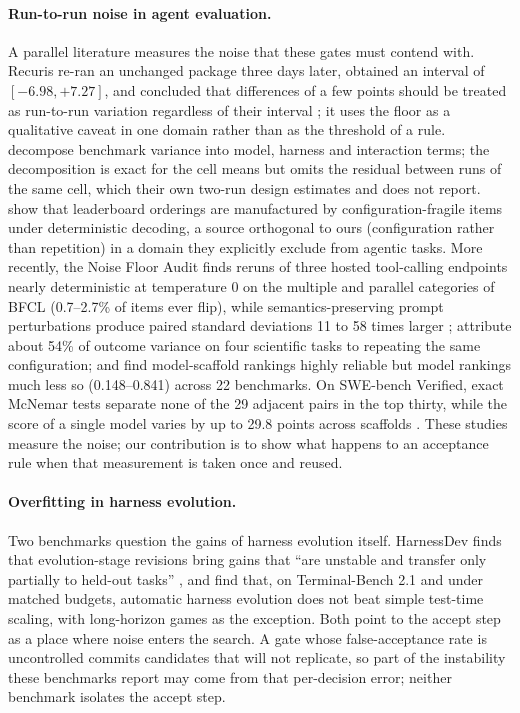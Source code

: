 \paragraph{Run-to-run noise in agent evaluation.}
A parallel literature measures the noise that these gates must contend with.
Recuris re-ran an unchanged package three days later, obtained an interval of
$[-6.98, +7.27]$, and concluded that differences of a few points should be
treated as run-to-run variation regardless of their interval
\citep{yu2026recuris}; it uses the floor as a qualitative caveat in one domain
rather than as the threshold of a rule. \citet{zhang2026stopcomparing}
decompose benchmark variance into model, harness and interaction terms; the
decomposition is exact for the cell means but omits the residual between runs
of the same cell, which their own two-run design estimates and does not report.
\citet{parupudi2026neutral} show that leaderboard orderings are manufactured
by configuration-fragile items under deterministic decoding, a source
orthogonal to ours (configuration rather than repetition) in a domain they
explicitly exclude from agentic tasks. More recently, the Noise Floor Audit finds reruns of three hosted tool-calling endpoints nearly deterministic at temperature 0 on the multiple and parallel categories of BFCL (0.7--2.7\% of items ever flip), while semantics-preserving prompt perturbations produce paired standard deviations 11 to 58 times larger \citep{chen2026noisefloor}; \citet{wiedmann2026systems} attribute about 54\% of
outcome variance on four scientific tasks to repeating the same configuration;
and \citet{hardy2026reliability} find model-scaffold rankings highly reliable
but model rankings much less so (0.148--0.841) across 22 benchmarks. On
SWE-bench Verified, exact McNemar tests separate none of the 29 adjacent pairs
in the top thirty, while the score of a single model varies by up to 29.8 points across scaffolds \citep{liu2026converged}. These studies measure the noise; our contribution is
to show what happens to an acceptance rule when that measurement is taken once
and reused.

\paragraph{Overfitting in harness evolution.}
Two benchmarks question the gains of harness evolution itself. HarnessDev
finds that evolution-stage revisions bring gains that ``are unstable and
transfer only partially to held-out tasks'' \citep{wu2026harnessdev}, and
\citet{wang2026rethinking} find that, on Terminal-Bench 2.1 and under matched
budgets, automatic harness evolution does not beat simple test-time scaling,
with long-horizon games as the exception. Both point to the accept step as a
place where noise enters the search. A gate whose false-acceptance rate is uncontrolled commits candidates that will not replicate, so part of the instability these benchmarks report may come from that per-decision error; neither benchmark isolates the accept step.

